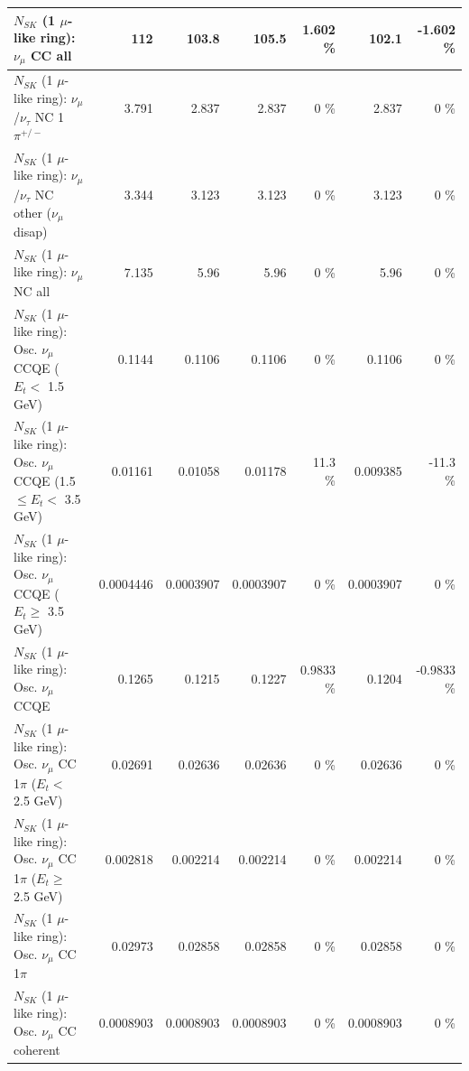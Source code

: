\begin{table}
\begin{tabular}{| l | r | r | r  r | r  r |}
                                $N_{SK}$ (1 $\mu$-like ring): $\nu_{\mu}$ CC all &             112 &           103.8 &           105.5 &    1.602 \%  &           102.1 &   -1.602 \%  \\ 
\hline
              $N_{SK}$ (1 $\mu$-like ring): $\nu_\mu$/$\nu_\tau$ NC 1$\pi^{+/-}$ &           3.791 &           2.837 &           2.837 &        0 \%  &           2.837 &        0 \%  \\ 
   $N_{SK}$ (1 $\mu$-like ring): $\nu_\mu$/$\nu_\tau$ NC other ($\nu_\mu$ disap) &           3.344 &           3.123 &           3.123 &        0 \%  &           3.123 &        0 \%  \\ 
                                $N_{SK}$ (1 $\mu$-like ring): $\nu_{\mu}$ NC all &           7.135 &            5.96 &            5.96 &        0 \%  &            5.96 &        0 \%  \\ 
\hline
\hline
           $N_{SK}$ (1 $\mu$-like ring): Osc. $\nu_\mu$ CCQE ($E_{t} <$ 1.5 GeV) &          0.1144 &          0.1106 &          0.1106 &        0 \%  &          0.1106 &        0 \%  \\ 
  $N_{SK}$ (1 $\mu$-like ring): Osc. $\nu_\mu$ CCQE (1.5 $\leq E_{t} <$ 3.5 GeV) &         0.01161 &         0.01058 &         0.01178 &     11.3 \%  &        0.009385 &    -11.3 \%  \\ 
        $N_{SK}$ (1 $\mu$-like ring): Osc. $\nu_\mu$ CCQE ($E_{t} \geq$ 3.5 GeV) &       0.0004446 &       0.0003907 &       0.0003907 &        0 \%  &       0.0003907 &        0 \%  \\ 
\hline
                               $N_{SK}$ (1 $\mu$-like ring): Osc. $\nu_\mu$ CCQE &          0.1265 &          0.1215 &          0.1227 &   0.9833 \%  &          0.1204 &  -0.9833 \%  \\ 
\hline
      $N_{SK}$ (1 $\mu$-like ring): Osc. $\nu_\mu$ CC 1$\pi$ ($E_{t} <$ 2.5 GeV) &         0.02691 &         0.02636 &         0.02636 &        0 \%  &         0.02636 &        0 \%  \\ 
   $N_{SK}$ (1 $\mu$-like ring): Osc. $\nu_\mu$ CC 1$\pi$ ($E_{t} \geq$ 2.5 GeV) &        0.002818 &        0.002214 &        0.002214 &        0 \%  &        0.002214 &        0 \%  \\ 
\hline
                          $N_{SK}$ (1 $\mu$-like ring): Osc. $\nu_\mu$ CC 1$\pi$ &         0.02973 &         0.02858 &         0.02858 &        0 \%  &         0.02858 &        0 \%  \\ 
                        $N_{SK}$ (1 $\mu$-like ring): Osc. $\nu_\mu$ CC coherent &       0.0008903 &       0.0008903 &       0.0008903 &        0 \%  &       0.0008903 &        0 \%  \\ 

\end{tabular}
\end{table}
